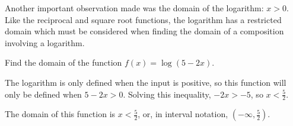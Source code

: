 Another important observation made was the domain of the logarithm: $x>0$. Like the reciprocal and square root functions, the logarithm has a restricted domain which must be considered when finding the domain of a composition involving a logarithm.

\begin{example}
Find the domain of the function $f(x)=\log(5-2x)$.

\begin{solution}  The logarithm is only defined when the input is positive, so this function will only be defined when $5-2x>0$. Solving this inequality, $-2x>-5$, so $x<\frac{5}{2}$.

The domain of this function is $x<\frac{5}{2}$, or, in interval notation, $\left(-\infty,\frac{5}{2}\right)$.
\end{solution}\end{example}
